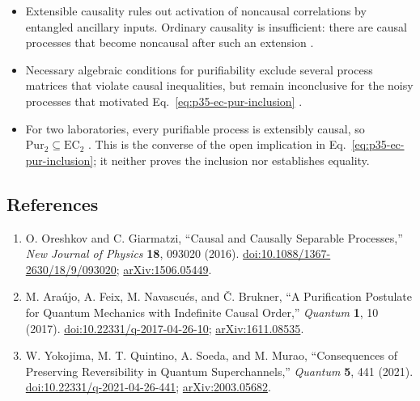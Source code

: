\begin{itemize}
  \item Extensible causality rules out activation of noncausal correlations
  by entangled ancillary inputs.  Ordinary causality is insufficient: there
  are causal processes that become noncausal after such an extension
  .

  \item Necessary algebraic conditions for purifiability exclude several
  process matrices that violate causal inequalities, but remain inconclusive
  for the noisy processes that motivated
  Eq.~\eqref{eq:p35-ec-pur-inclusion}
  .

  \item For two laboratories, every purifiable process is extensibly causal,
  so $\mathrm{Pur}_2\subseteq\mathrm{EC}_2$
  .  This is the converse of the open
  implication in Eq.~\eqref{eq:p35-ec-pur-inclusion}; it neither proves the
  inclusion nor establishes equality.
\end{itemize}

\subsection*{References}

\begin{enumerate}[label={},leftmargin=4.8em,labelsep=0.5em]
  \footnotesize
  \item[\textup{[OG16]}]\label{ref:p35-oreshkov}
  O. Oreshkov and C. Giarmatzi, ``Causal and Causally Separable Processes,''
  \emph{New Journal of Physics} \textbf{18}, 093020 (2016).
  \href{https://doi.org/10.1088/1367-2630/18/9/093020}{doi:10.1088/1367-2630/18/9/093020};
  \href{https://arxiv.org/abs/1506.05449}{arXiv:1506.05449}.

  \item[\textup{[AFN+17]}]\label{ref:p35-araujo}
  M. Ara\'ujo, A. Feix, M. Navascu\'es, and \v{C}. Brukner,
  ``A Purification Postulate for Quantum Mechanics with Indefinite Causal
  Order,'' \emph{Quantum} \textbf{1}, 10 (2017).
  \href{https://doi.org/10.22331/q-2017-04-26-10}{doi:10.22331/q-2017-04-26-10};
  \href{https://arxiv.org/abs/1611.08535}{arXiv:1611.08535}.

  \item[\textup{[YQS+21]}]\label{ref:p35-yokojima}
  W. Yokojima, M. T. Quintino, A. Soeda, and M. Murao,
  ``Consequences of Preserving Reversibility in Quantum Superchannels,''
  \emph{Quantum} \textbf{5}, 441 (2021).
  \href{https://doi.org/10.22331/q-2021-04-26-441}{doi:10.22331/q-2021-04-26-441};
  \href{https://arxiv.org/abs/2003.05682}{arXiv:2003.05682}.
\end{enumerate}

